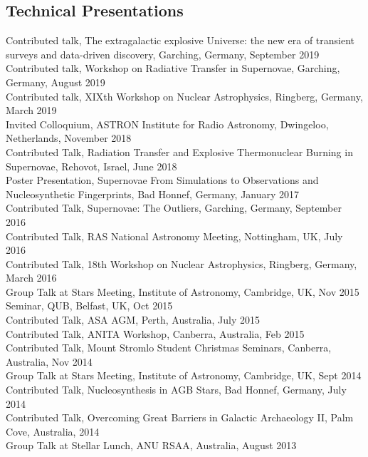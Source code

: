 \documentclass[11pt]{res} %
\begin{document}
\begin{resume}
\section{Technical Presentations}
  Contributed talk, The extragalactic explosive Universe: the new era of transient surveys and data-driven discovery, Garching, Germany, September 2019\\
  Contributed talk, Workshop on Radiative Transfer in Supernovae, Garching, Germany, August 2019\\
  Contributed talk, XIXth Workshop on Nuclear Astrophysics, Ringberg, Germany, March 2019\\
  Invited Colloquium, ASTRON Institute for Radio Astronomy, Dwingeloo, Netherlands, November 2018\\
  Contributed Talk, Radiation Transfer and Explosive Thermonuclear Burning in Supernovae, Rehovot, Israel, June 2018\\
  Poster Presentation, Supernovae From Simulations to Observations and Nucleosynthetic Fingerprints, Bad Honnef, Germany, January 2017\\
  Contributed Talk, Supernovae: The Outliers, Garching, Germany, September 2016\\
  Contributed Talk, RAS National Astronomy Meeting, Nottingham, UK, July 2016\\
  Contributed Talk, 18th Workshop on Nuclear Astrophysics, Ringberg, Germany, March 2016\\
  Group Talk at Stars Meeting, Institute of Astronomy, Cambridge, UK, Nov 2015\\
  Seminar, QUB, Belfast, UK, Oct 2015\\
  Contributed Talk, ASA AGM, Perth, Australia, July 2015\\
  Contributed Talk, ANITA Workshop, Canberra, Australia, Feb 2015\\
  Contributed Talk, Mount Stromlo Student Christmas Seminars, Canberra, Australia, Nov 2014\\
  Group Talk at Stars Meeting, Institute of Astronomy, Cambridge, UK, Sept 2014\\
  Contributed Talk, Nucleosynthesis in AGB Stars, Bad Honnef, Germany, July 2014\\
  Contributed Talk, Overcoming Great Barriers in Galactic Archaeology II, Palm Cove, Australia, 2014\\
  Group Talk at Stellar Lunch, ANU RSAA, Australia, August 2013\\


\end{resume}
\end{document}
